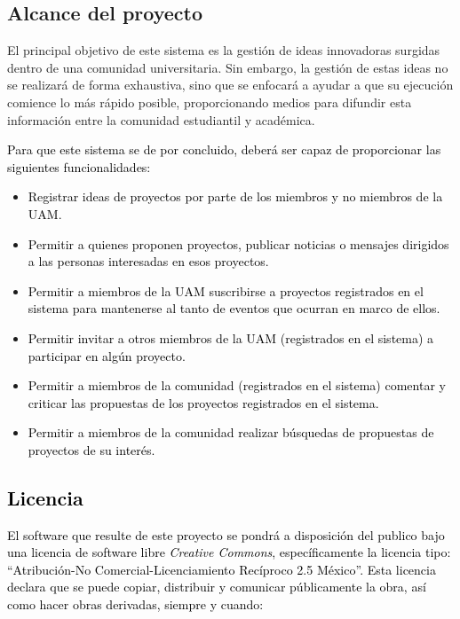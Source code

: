 \documentclass[11pt,letterpaper,titlepage]{article}
\begin{document}
\subsection{Alcance del proyecto}

El principal objetivo de este sistema es la gesti\'on de ideas innovadoras surgidas dentro de una comunidad universitaria. Sin embargo, la gesti\'on de estas ideas no se realizar\'a de forma exhaustiva, sino que se enfocar\'a a ayudar a que su ejecuci\'on comience lo m\'as r\'apido posible, proporcionando medios para difundir esta informaci\'on entre la comunidad estudiantil y acad\'emica. 

\textcolor{black}{Para que este sistema se de por concluido, deber\'a ser capaz de proporcionar las siguientes funcionalidades:}

\begin{itemize}
 \item \textcolor{black}{Registrar ideas de proyectos por parte de los miembros y no miembros de la UAM.}
 \item \textcolor{black}{Permitir a quienes proponen proyectos, publicar noticias o mensajes dirigidos a las personas interesadas en esos proyectos.}
 \item \textcolor{black}{Permitir a miembros de la UAM suscribirse a proyectos registrados en el sistema para mantenerse al tanto de eventos que ocurran en marco de ellos.}
 \item \textcolor{black}{Permitir invitar a otros miembros de la UAM (registrados en el sistema) a participar en alg\'un proyecto.}
 \item \textcolor{black}{Permitir a miembros de la comunidad (registrados en el sistema) comentar y criticar las propuestas de los proyectos registrados en el sistema.}
 \item \textcolor{black}{Permitir a miembros de la comunidad realizar b\'usquedas de propuestas de proyectos de su inter\'es.}

\end{itemize}
\textcolor{black}{
\subsection{Licencia}
El software que resulte de este proyecto se pondr\'a a disposici\'on del publico bajo una licencia de software libre \textit{Creative Commons}, espec\'ificamente la licencia tipo: ``Atribuci\'on-No Comercial-Licenciamiento Rec\'iproco 2.5 M\'exico''. Esta licencia declara que se puede copiar, distribuir y comunicar p\'ublicamente la obra, as\'i como hacer obras derivadas, siempre y cuando:}
\end{document}
